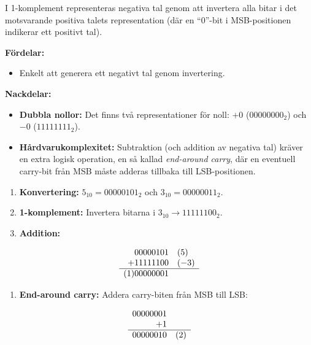 \documentclass[
  swedish,
  letterpaper,
  oneside,
  openany]{book}
\providecommand{\tightlist}{%
  \setlength{\itemsep}{0pt}\setlength{\parskip}{0pt}}
\begin{document}
I 1-komplement representeras negativa tal genom att invertera alla bitar
i det motsvarande positiva talets representation (där en ``0''-bit i
MSB-positionen indikerar ett positivt tal).

\textbf{Fördelar:}

\begin{itemize}
\tightlist
\item
  Enkelt att generera ett negativt tal genom invertering.
\end{itemize}

\textbf{Nackdelar:}

\begin{itemize}
\tightlist
\item
  \textbf{Dubbla nollor:} Det finns två representationer för noll:
  \(+0\) (\(00000000_2\)) och \(-0\) (\(11111111_2\)).
\item
  \textbf{Hårdvarukomplexitet:} Subtraktion (och addition av negativa
  tal) kräver en extra logisk operation, en så kallad \emph{end-around
  carry}, där en eventuell carry-bit från MSB måste adderas tillbaka
  till LSB-positionen.
\end{itemize}

\begin{tcolorbox}[enhanced jigsaw, arc=.35mm, bottomrule=.15mm, bottomtitle=1mm, breakable, colback=white, colbacktitle=quarto-callout-note-color!10!white, colframe=quarto-callout-note-color-frame, coltitle=black, left=2mm, leftrule=.75mm, opacityback=0, opacitybacktitle=0.6, rightrule=.15mm, title=\textcolor{quarto-callout-note-color}{\faInfo}\hspace{0.5em}{Exempel: \(5_{10} - 3_{10}\) i 8-bitars 1-komplement}, titlerule=0mm, toprule=.15mm, toptitle=1mm]

\begin{enumerate}
\def\labelenumi{\arabic{enumi}.}
\tightlist
\item
  \textbf{Konvertering:} \(5_{10} = 00000101_2\) och
  \(3_{10} = 00000011_2\).
\item
  \textbf{1-komplement:} Invertera bitarna i
  \(3_{10} \rightarrow 11111100_2\).
\item
  \textbf{Addition:}
\end{enumerate}

\[
\begin{array}{r@{\quad}l}
   00000101 & (5) \\
+  11111100 & (-3) \\
\hline
(1)00000001 & 
\end{array}
\]

\begin{enumerate}
\def\labelenumi{\arabic{enumi}.}
\setcounter{enumi}{3}
\tightlist
\item
  \textbf{End-around carry:} Addera carry-biten från MSB till LSB:
\end{enumerate}

\[
\begin{array}{r@{\quad}l}
   00000001 & \\
+  1 & \\
\hline
   00000010 & (2)
\end{array}
\]

\end{tcolorbox}
\end{document}

